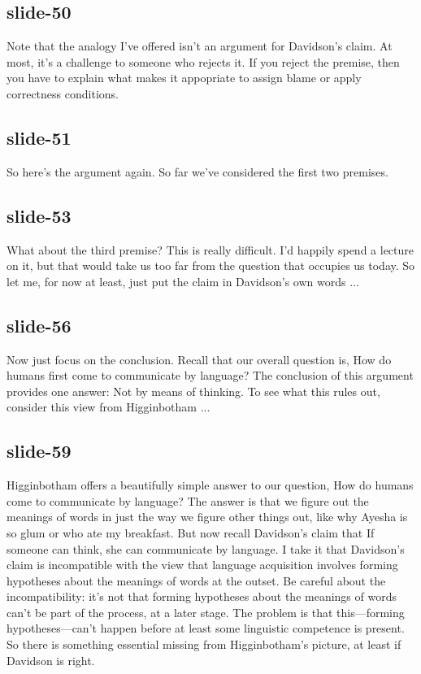 \documentclass[12pt,\papersize]{extarticle}
\begin{document}
 
\subsection{slide-50}
Note that the analogy I've offered isn't an argument for Davidson's claim.
At most, it's a challenge to someone who rejects it.
If you reject the premise, then you have to explain what makes it appopriate to assign blame or apply correctness conditions.
 
 
\subsection{slide-51}
So here's the argument again.
So far we've considered the first two premises.
 
 
\subsection{slide-53}
What about the third premise?
This is really difficult.
I'd happily spend a lecture on it, but that would take us too far from the question that occupies us today.
So let me, for now at least, just put the claim in Davidson's own words ...
 
 
\subsection{slide-56}
Now just focus on the conclusion.
Recall that our overall question is, How do humans first come to communicate by language?
The conclusion of this argument provides one answer: Not by means of thinking.
To see what this rules out, consider this view from Higginbotham ...
 
 
\subsection{slide-59}
Higginbotham offers a beautifully simple answer to our question, How do humans come to communicate by language?
The answer is that we figure out the meanings of words in just the way we figure other things out, like why Ayesha is so glum or who ate my breakfast.
But now recall Davidson's claim that If someone can think, she can communicate by language.
I take it that Davidson's claim is incompatible with the view that language acquisition involves forming hypotheses about the meanings of words at the outset.
Be careful about the incompatibility: it's not that forming hypotheses about the meanings of words can't be part of the process, at a later stage.
The problem is that this---forming hypotheses---can't happen before at least some linguistic competence is present.
So there is something essential missing from Higginbotham's picture, at least if Davidson is right.
 
\end{document}
